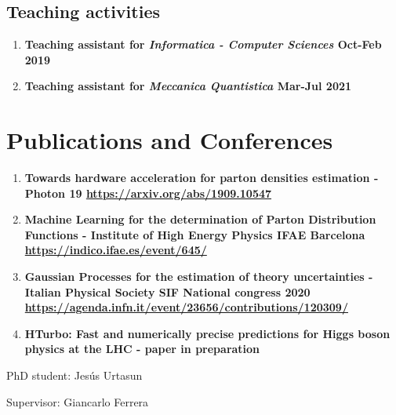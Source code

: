 \documentclass[12pt]{article}
\begin{document}
\subsection{Teaching activities}

\begin{enumerate}{\leftmargin 15pt \itemsep 0pt \topsep 3pt}
	\item{\bf Teaching assistant for \textit{Informatica - Computer Sciences} \hspace{1cm} Oct-Feb 2019}
	\item{\bf Teaching assistant for \textit{Meccanica Quantistica} \hspace{3.5cm} Mar-Jul 2021}
\end{enumerate}

\section{Publications and Conferences}

\begin{enumerate}{\leftmargin 15pt \itemsep 0pt \topsep 3pt}
	\item{\bf Towards hardware acceleration for parton densities estimation - Photon 19 \href{https://arxiv.org/abs/1909.10547}{https://arxiv.org/abs/1909.10547}}
	\item{\bf Machine Learning for the determination of Parton Distribution
		Functions - Institute of High Energy Physics IFAE Barcelona \\ \href{https://indico.ifae.es/event/645/}{https://indico.ifae.es/event/645/}}
	\item{\bf Gaussian Processes for the estimation of theory uncertainties - Italian Physical Society SIF National congress 2020\\ \href{https://agenda.infn.it/event/23656/contributions/120309/}{https://agenda.infn.it/event/23656/contributions/120309/}}
	\item {\bf HTurbo: Fast and numerically precise predictions for Higgs boson physics at the LHC - paper in preparation}
\end{enumerate}

\newpage


\hspace{2cm}


PhD student: Jes\'us Urtasun\\

\hspace{2cm}

\indent Supervisor: Giancarlo Ferrera
\end{document}
